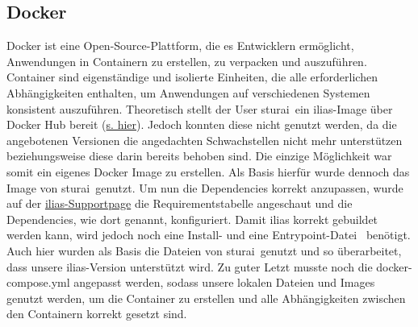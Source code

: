 \documentclass[10pt, a4paper,onecolumn ,titlepage]{article}
\begin{document}
    \subsection{Docker}
    \label{subsec:docker}
    Docker ist eine Open-Source-Plattform, die es Entwicklern ermöglicht, Anwendungen in Containern zu erstellen, zu verpacken und auszuführen.
    Container sind eigenständige und isolierte Einheiten, die alle erforderlichen Abhängigkeiten enthalten, um Anwendungen auf verschiedenen Systemen konsistent auszuführen.\parencite{docker}
    Theoretisch stellt der User \glqq sturai\grqq\ ein \ac{ilias}-Image über Docker Hub bereit (\href{https://hub.docker.com/r/sturai/ilias#!}{s. hier}).
    Jedoch konnten diese nicht genutzt werden, da die angebotenen Versionen die angedachten Schwachstellen nicht mehr unterstützen beziehungsweise diese darin bereits behoben sind.
    Die einzige Möglichkeit war somit ein eigenes Docker Image zu erstellen.
    Als Basis hierfür wurde dennoch das Image von \glqq sturai\grqq\ genutzt.
    Um nun die Dependencies korrekt anzupassen, wurde auf der \href{https://docu.ilias.de/goto_docu_lm_367.html}{\ac{ilias}-Supportpage} die Requirementstabelle angeschaut und die Dependencies, wie dort genannt, konfiguriert.
    Damit \ac{ilias} korrekt gebuildet werden kann, wird jedoch noch eine Install- und eine Entrypoint-Datei~\parencite{dockerEntrypoints} benötigt.
    Auch hier wurden als Basis die Dateien von \glqq sturai\grqq\ genutzt und so überarbeitet, dass unsere \ac{ilias}-Version unterstützt wird.
    Zu guter Letzt musste noch die docker-compose.yml angepasst werden, sodass unsere lokalen Dateien und Images genutzt werden, um die Container zu erstellen und alle Abhängigkeiten zwischen den Containern korrekt gesetzt sind.
\end{document}
